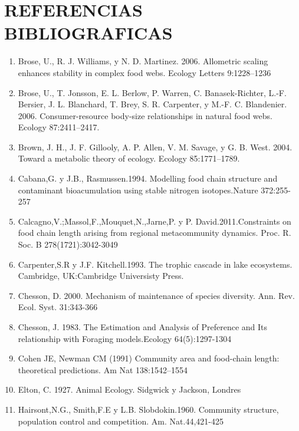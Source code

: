 \documentclass[a4paper,11pt]{article}
\begin{document}
\section{REFERENCIAS BIBLIOGRAFICAS}
\begin{enumerate}
\item Brose, U., R. J. Williams, y N. D. Martinez. 2006. Allometric scaling enhances stability in complex food webs. Ecology Letters 9:1228–1236
\item Brose, U., T. Jonsson, E. L. Berlow, P. Warren, C. Banasek-Richter, L.-F. Bersier, J. L. Blanchard, T. Brey, S. R. Carpenter, y M.-F. C. Blandenier. 2006. Consumer-resource body-size relationships in natural food webs. Ecology 87:2411–2417.\\
\item Brown, J. H., J. F. Gillooly, A. P. Allen, V. M. Savage, y G. B. West. 2004. Toward a metabolic theory of ecology. Ecology 85:1771–1789. \\
\item Cabana,G. y J.B., Rasmussen.1994. Modelling food chain structure and contaminant bioacumulation using stable nitrogen isotopes.Nature 372:255-257 \\
\item Calcagno,V.;Massol,F.,Mouquet,N.,Jarne,P. y  P. David.2011.Constraints on food chain length arising from regional metacommunity dynamics. Proc. R. Soc. B 278(1721):3042-3049\\
\item Carpenter,S.R y J.F. Kitchell.1993. The trophic cascade in lake ecosystems. Cambridge, UK:Cambridge Universisty Press.\\
\item Chesson, D. 2000. Mechanism of maintenance of species diversity. Ann. Rev. Ecol. Syst. 31:343-366\\
\item Chesson, J. 1983. The Estimation and Analysis  of Preference and Its relationship with Foraging models.Ecology 64(5):1297-1304\\
\item Cohen JE, Newman CM (1991) Community area and food-chain length: theoretical predictions. Am Nat 138:1542–1554\\
\item Elton, C. 1927. Animal Ecology.  Sidgwick y Jackson, Londres\\
\item Hairsont,N.G., Smith,F.E y L.B. Slobdokin.1960. Community structure, population control and competition. Am. Nat.44,421-425\\

\end{enumerate}
\end{document}
